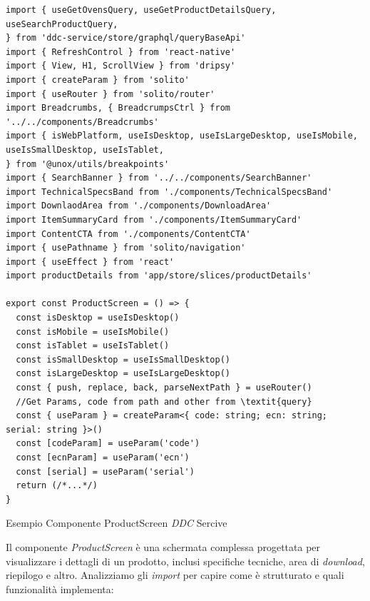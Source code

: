 \begin{listing}[H]
    \begin{verbatim} 
import { useGetOvensQuery, useGetProductDetailsQuery, useSearchProductQuery,
} from 'ddc-service/store/graphql/queryBaseApi'
import { RefreshControl } from 'react-native'
import { View, H1, ScrollView } from 'dripsy'
import { createParam } from 'solito'
import { useRouter } from 'solito/router'
import Breadcrumbs, { BreadcrumpsCtrl } from '../../components/Breadcrumbs'
import { isWebPlatform, useIsDesktop, useIsLargeDesktop, useIsMobile, useIsSmallDesktop, useIsTablet,
} from '@unox/utils/breakpoints'
import { SearchBanner } from '../../components/SearchBanner'
import TechnicalSpecsBand from './components/TechnicalSpecsBand'
import DownlaodArea from './components/DownloadArea'
import ItemSummaryCard from './components/ItemSummaryCard'
import ContentCTA from './components/ContentCTA'
import { usePathname } from 'solito/navigation'
import { useEffect } from 'react'
import productDetails from 'app/store/slices/productDetails'

export const ProductScreen = () => {
  const isDesktop = useIsDesktop()
  const isMobile = useIsMobile()
  const isTablet = useIsTablet()
  const isSmallDesktop = useIsSmallDesktop()
  const isLargeDesktop = useIsLargeDesktop()
  const { push, replace, back, parseNextPath } = useRouter()
  //Get Params, code from path and other from \textit{query}
  const { useParam } = createParam<{ code: string; ecn: string; serial: string }>()
  const [codeParam] = useParam('code')
  const [ecnParam] = useParam('ecn')
  const [serial] = useParam('serial')
  return (/*...*/)
}
    \end{verbatim}
    \caption{Esempio Componente ProductScreen \textit{DDC} Sercive}
    \label{listing_productscreen_ddcservice}
\end{listing}

Il componente \textit{ProductScreen} è una schermata complessa progettata per visualizzare i dettagli di un prodotto, 
inclusi specifiche tecniche, area di \textit{download}, riepilogo e altro.
Analizziamo gli \textit{import} per capire come è strutturato e quali funzionalità implementa:

